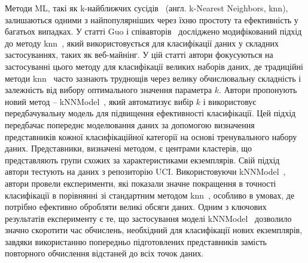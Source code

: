 Методи ML, такі як k-найближчих сусідів~\cite{ct4} (англ. k-Nearest Neighbors, knn), залишаються одними з найпопулярніших через їхню простоту та ефективність у багатьох випадках. У статті Guo і співавторів~\cite{ct13} досліджено модифікований підхід до методу knn~\cite{ct4}, який використовується для класифікації даних у складних застосуваннях, таких як веб-майнінг. У цій статті автори фокусуються на застосуванні цього методу для класифікації великих наборів даних, де традиційні методи knn~\cite{ct4} часто зазнають труднощів через велику обчислювальну складність і залежність від вибору оптимального значення параметра \( k \). Автори пропонують новий метод -- kNNModel~\cite{ct13}, який автоматизує вибір \( k \) і використовує передбачувальну модель для підвищення ефективності класифікації. Цей підхід передбачає попереднє моделювання даних за допомогою визначення представників кожної класифікаційної категорії на основі тренувального набору даних. Представники, визначені методом, є центрами кластерів, що представляють групи схожих за характеристиками екземплярів. Свій підхід автори тестують на даних з репозиторію UCI. Використовуючи kNNModel~\cite{ct13}, автори провели експерименти, які показали значне покращення в точності класифікації в порівнянні зі стандартним методом knn~\cite{ct4}, особливо в умовах, де потрібно ефективно обробляти великі обсяги даних. Одним з ключових результатів експерименту є те, що застосування моделі kNNModel~\cite{ct13} дозволило значно скоротити час обчислень, необхідний для класифікації нових екземплярів, завдяки використанню попередньо підготовлених представників замість повторного обчислення відстаней до всіх точок даних.


